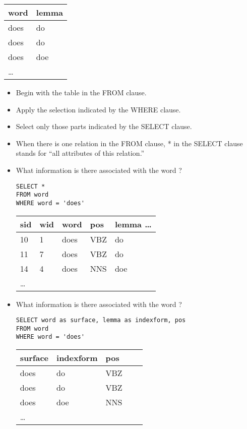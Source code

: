 \documentclass[a4paper,landscape,headrule,footrule,dvips]{foils}
\begin{document}
\begin{CJK}{UTF8}{min}
\begin{itemize}
  \begin{tabular}{ll}
    \textbf{word} & \textbf{lemma} \\ \hline
    does & do \\
    does & do \\
    does & doe \\
    \ldots
  \end{tabular}
\end{itemize}


\begin{itemize}
\item Begin with the table in the FROM clause.
\item Apply the selection indicated by the WHERE clause.
\item Select only those parts indicated by the SELECT clause.
\end{itemize}


\begin{itemize}
\item When there is one relation in the FROM clause, * in the SELECT clause stands for “all attributes of this relation.”
\item What information is there associated with the word ?
\begin{verbatim}
SELECT *
FROM word
WHERE word = 'does'
\end{verbatim}
  \begin{tabular}{lllll}
   \textbf{sid} & \textbf{wid} &  \textbf{word} & \textbf{pos} & \textbf{lemma} \ldots \\ \hline
    10 & 1 & does & VBZ & do \\
    11 & 7 & does & VBZ & do \\
    14 & 4 & does & NNS & doe \\
    \ldots
  \end{tabular}
\end{itemize}


\begin{itemize}
\item What information is there associated with the word ?
\begin{verbatim}
SELECT word as surface, lemma as indexform, pos
FROM word
WHERE word = 'does'
\end{verbatim}
  \begin{tabular}{lllll}
    \textbf{surface}  & \textbf{indexform}  &  \textbf{pos} \\ \hline
    does & do  & VBZ \\
    does & do  & VBZ \\
    does & doe & NNS \\
    \ldots
  \end{tabular}
\end{itemize}


\end{CJK}
\end{document}

